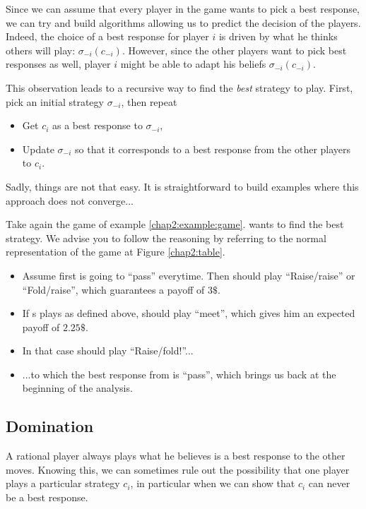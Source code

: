 Since we can assume that every player in the game wants to pick a best response, we can try and build algorithms allowing us to predict the decision of the players.
Indeed, the choice of a best response for player $i$ is driven by what he thinks others will play: $\sigma_{-i}(c_{-i}) $. However, since the other players want to pick best responses as well, player $i$ might be able to adapt his beliefs $\sigma_{-i}(c_{-i}) $.

This observation leads to a recursive way to  find the \emph{best} strategy to play. First, pick an initial strategy $\sigma_{-i}$,  then repeat
\begin{itemize}
 \item Get $c_i$ as a best response to $\sigma_{-i}$,
 \item Update $\sigma_{-i}$ so that it corresponds to a best response from the other players to $c_i$.
\end{itemize}

Sadly, things are not that easy. It is straightforward to build examples where this approach does not converge...

\begin{example}
Take again the game of example \ref{chap2:example:game}. \TAtwo{} wants to find the best strategy. We advise you to follow the reasoning by referring to the normal representation of the game at Figure \ref{chap2:table}.

\begin{itemize}
\item Assume first \TAone{} is going to ``pass'' everytime. Then \TAtwo{} should play ``Raise/raise'' or ``Fold/raise'', which guarantees a payoff of $3\$$.
\item If \TAtwo{}s plays as defined above, \TAone{} should play ``meet'', which gives him an expected payoff of $2.25\$$.
\item In that case \TAtwo{} should play ``Raise/fold!''...
\item ...to which the best response from \TAone{} is ``pass'', which brings us back at the beginning of the analysis.
\end{itemize}
\label{chap2:example:bestresponseequilibria}
\end{example}


\subsection{Domination}

A rational player always plays what he believes is a best response to the other moves. Knowing this, we can sometimes rule out the possibility that one player plays a particular strategy $c_i$, in particular when we can show that $c_i$ can never be a best response.

